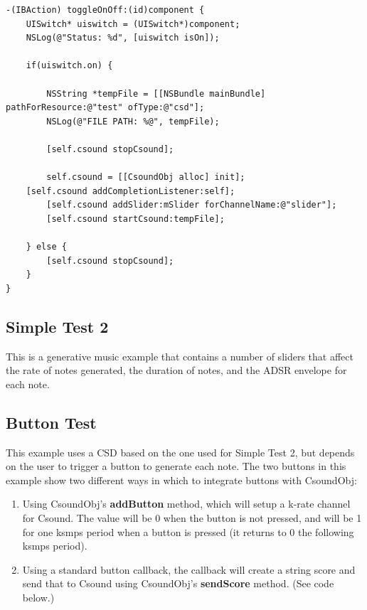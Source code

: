 \documentclass[11pt]{article}
\begin{document}
\begin{lstlisting}[caption=Example code showing configuring and starting a CsoundObj]
-(IBAction) toggleOnOff:(id)component {
    UISwitch* uiswitch = (UISwitch*)component;
    NSLog(@"Status: %d", [uiswitch isOn]);
    
    if(uiswitch.on) {
      
        NSString *tempFile = [[NSBundle mainBundle] pathForResource:@"test" ofType:@"csd"];  
        NSLog(@"FILE PATH: %@", tempFile);
        
        [self.csound stopCsound];
        
        self.csound = [[CsoundObj alloc] init];
    [self.csound addCompletionListener:self];
        [self.csound addSlider:mSlider forChannelName:@"slider"];
        [self.csound startCsound:tempFile];
        
    } else {
        [self.csound stopCsound];
    }
}
\end{lstlisting}

\subsection{Simple Test 2}

This is a generative music example that contains a number of sliders that affect the rate of notes generated, the duration of notes, and the ADSR envelope for each note. 


\subsection{Button Test}

This example uses a CSD based on the one used for Simple Test 2, but depends on the user to trigger a button to generate each note.  The two buttons in this example show two different ways in which to integrate buttons with CsoundObj:

\begin{enumerate}
\item Using CsoundObj's \textbf{addButton} method, which will setup a k-rate channel for Csound.  The value will be 0 when the button is not pressed, and will be 1 for one ksmps period when a button is pressed (it returns to 0 the following ksmps period). 
\item Using a standard button callback, the callback will create a string score and send that to Csound using CsoundObj's \textbf{sendScore} method. (See code below.)
\end{enumerate}
\end{document}
